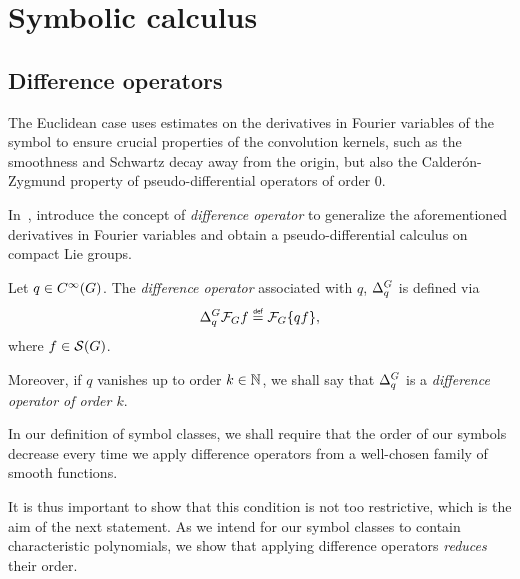 \chapter{Symbolic calculus}
\label{chapter:symbolic_calculus}

\section{Difference operators}

The Euclidean case uses estimates on the derivatives in Fourier variables of the symbol
to ensure crucial properties of the convolution kernels,
such as the smoothness and Schwartz decay away from the origin,
but also the Calder\'on-Zygmund property of pseudo-differential operators of order $0$.

In~\cite{RuzhanskyTurunen10},
\citeauthor{RuzhanskyTurunen10} introduce the concept of \emph{difference operator}
to generalize the aforementioned derivatives in Fourier variables
and obtain a pseudo-differential calculus on compact Lie groups.

\begin{definition}
\label{definition:difference_operators}
    Let $q \in {C^\infty(G)}$.
    The \emph{difference operator} associated with $q$, ${\Delta^{G}_{q}}$ is defined via
    \begin{align*}
        \DifferenceOperator{q} \Fourier f \defeq \Fourier\{q f\},
    \end{align*}
    where $f \in {\mathcal{S} (G)}$.

    Moreover, if $q$ vanishes up to order $k \in \mathbb{N}$,
    we shall say that ${\Delta^{G}_{q}}$ is a \emph{difference operator of order $k$}.
\end{definition}

In our definition of symbol classes,
we shall require that the order of our symbols decrease
every time we apply difference operators from a well-chosen family of smooth functions.

It is thus important to show that this condition is not too restrictive,
which is the aim of the next statement.
As we intend for our symbol classes to contain characteristic polynomials,
we show that applying difference operators \emph{reduces} their order.

